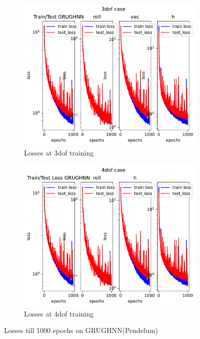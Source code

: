 \begin{figure}[H]
	\centering
	\begin{subfigure}[b]{0.4\textwidth}
		\centering
		\includegraphics[width=\textwidth]{chapters/chapter5/loss_3dof1000.pdf}
		\caption{Losses at 3dof training}
	\end{subfigure}
	\hfill
	\begin{subfigure}[b]{0.4\textwidth}
		\centering
		\includegraphics[width=\textwidth]{chapters/chapter5/loss_4dof1000.pdf}
		\caption{Losses at 4dof training}
	\end{subfigure}
	
	
	\caption{Losses till 1000 epochs on GRUGHNN(Pendelum)}
	\label{fig_traj}
\end{figure}

